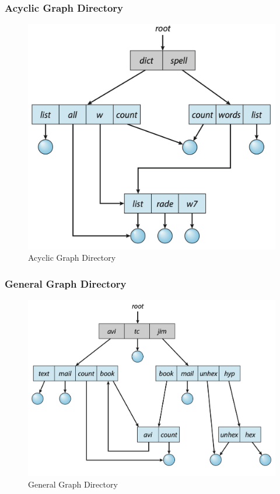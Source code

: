 \documentclass[oneside]{book}
\begin{document}
                    \subsubsection{Acyclic Graph Directory}
                        \begin{figure}[H]
                            \centering
                            \includegraphics[width=0.6\linewidth]{figures/acyclic_graph_dir.png}
                            \caption{Acyclic Graph Directory}
                        \end{figure}
                    \subsubsection{General Graph Directory}
                        \begin{figure}[H]
                            \centering
                            \includegraphics[width=0.6\linewidth]{figures/general_graph_dir.png}
                            \caption{General Graph Directory}
                        \end{figure}
                        
\end{document}
